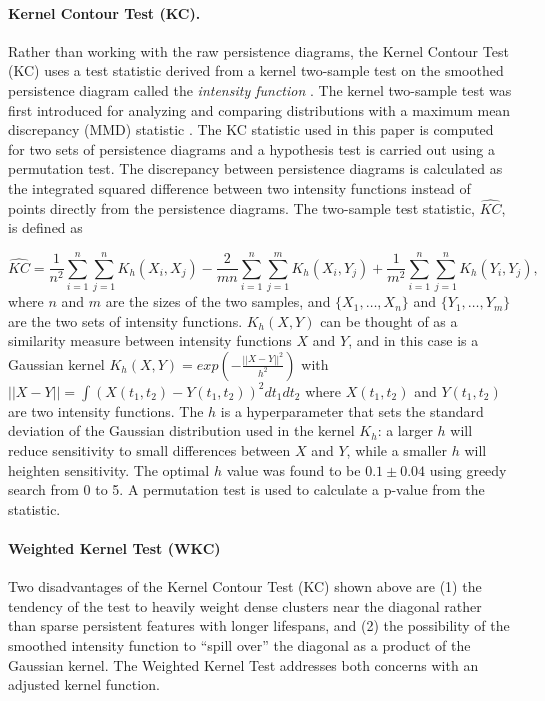 \documentclass[12pt]{article}
\begin{document}
\paragraph{Kernel Contour Test (KC).}
Rather than working with the raw persistence diagrams, the Kernel Contour Test (KC) uses a test statistic derived from a kernel two-sample test on the smoothed persistence diagram called the \emph{intensity function} \cite{chen2015statistical}.  The kernel two-sample test was first introduced for analyzing and comparing distributions with a maximum mean discrepancy (MMD) statistic \cite{gretton2012kernel}. The KC statistic used in this paper is computed for two sets of persistence diagrams and a hypothesis test is carried out using a permutation test.  The discrepancy between persistence diagrams is calculated as the integrated squared difference between two intensity functions instead of points directly from the persistence diagrams. The two-sample test statistic, $\widehat{KC}$, is defined as
\begin{sloppypar}
\begin{equation*}
\widehat{KC} = \frac{1}{n^{2}}\sum_{i=1}^{n}\sum_{j=1}^{n} K_{h}(X_{i}, X_{j}) - \frac{2}{mn}\sum_{i=1}^{n}\sum_{j=1}^{m}K_{h}(X_{i}, Y_{j}) + \frac{1}{m^{2}}\sum_{i=1}^{n}\sum_{j=1}^{n} K_{h}(Y_{i}, Y_{j}),
\end{equation*}
where $n$ and $m$ are the sizes of the two samples, and $\{X_1, \ldots, X_n\}$ and $\{Y_1, \ldots, Y_m\}$ are the two sets of intensity functions.  $K_{h}(X,Y)$ can be thought of as a similarity measure between intensity functions $X$ and $Y$, and in this case is a Gaussian kernel $K_{h}(X,Y) = exp(-\frac{||X - Y||^{2}}{h^{2}})$ with  $||X - Y|| = \int \left(X(t_1, t_2) - Y(t_1, t_2)\right)^2dt_1dt_2$  where $X(t_1, t_2)$ and $Y(t_1, t_2)$ are two intensity functions. The $h$ is a hyperparameter that sets the standard deviation of the Gaussian distribution used in the kernel $K_{h}$: a larger $h$ will reduce sensitivity to small differences between $X$ and $Y$, while a smaller $h$ will heighten sensitivity. The optimal $h$ value was found to be $0.1 \pm 0.04$ using greedy search from 0 to 5. A permutation test is used to calculate a p-value from the statistic.
\end{sloppypar}

\paragraph{Weighted Kernel Test (WKC)}
Two disadvantages of the Kernel Contour Test (KC) shown above are (1) the tendency of the test to heavily weight dense clusters near the diagonal rather than sparse persistent features with longer lifespans, and (2) the possibility of the smoothed intensity function to ``spill over'' the diagonal as a product of the Gaussian kernel. The Weighted Kernel Test \cite{chen2015statistical} addresses both concerns with an adjusted kernel function. 
\end{document}

